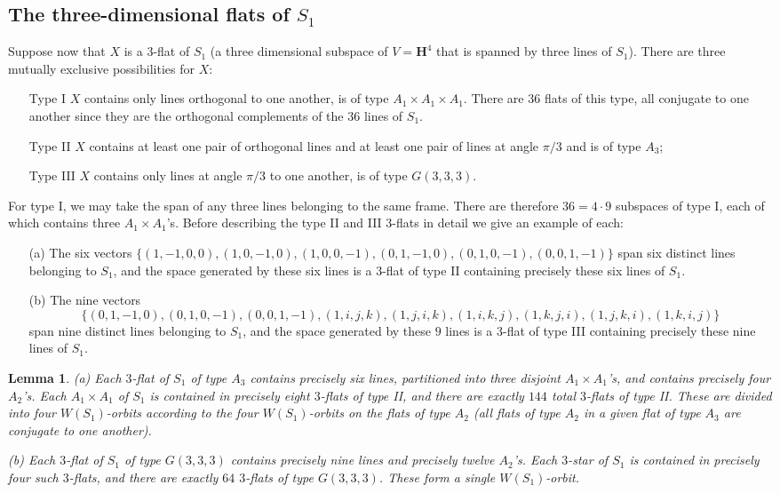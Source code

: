 \documentclass[11pt, reqno]{amsart}
\numberwithin{equation}{section}
\theoremstyle{definition}
\theoremstyle{plain}
\newtheorem{lemma}[theorem]{Lemma}
\newcommand{\HH}{\mathbf{H}}
\begin{document}
\subsection{The three-dimensional flats of $S_1$} Suppose now that $X$ is a $3$-flat of $S_1$ (a three dimensional subspace of $V=\HH^4$ that is spanned by three lines of $S_1$). There are three mutually exclusive possibilities for $X$: 

\begin{itemize}
\item[Type I] $X$ contains only lines orthogonal to one another, is of type $A_1 \times A_1 \times A_1$. There are $36$ flats of this type, all conjugate to one another since they are the orthogonal complements of the $36$ lines of $S_1$.
\item[Type II] $X$ contains at least one pair of orthogonal lines and at least one pair of lines at angle $\pi/3$ and is of type $A_3$; 
\item[Type III] $X$ contains only lines at angle $\pi/3$ to one another, is of type $G(3,3,3)$. 
\end{itemize} For type I, we may take the span of any three lines belonging to the same frame. There are therefore $36=4 \cdot 9$ subspaces of type I, each of which contains three $A_1 \times A_1$'s. Before describing the type II and III $3$-flats in detail we give an example of each:
\begin{itemize}
\item[(a)] The six vectors $\{(1,-1,0,0),(1,0,-1,0),(1,0,0,-1),(0,1,-1,0),(0,1,0,-1),(0,0,1,-1)\}$ span six distinct lines belonging to $S_1$, and the space generated by these six lines is a $3$-flat of type II containing precisely these six lines of $S_1$. 
\item[(b)] The nine vectors $$\{(0,1,-1,0),(0,1,0,-1),(0,0,1,-1),(1,i,j,k),(1,j,i,k),(1,i,k,j),(1,k,j,i),(1,j,k,i),(1,k,i,j)\}$$ span nine distinct lines belonging to $S_1$, and the space generated by these $9$ lines is a $3$-flat of type III containing precisely these nine lines of $S_1$.
\end{itemize}
\begin{lemma}
\item[(a)] Each $3$-flat of $S_1$ of type $A_3$ contains precisely six lines, partitioned into three disjoint $A_1 \times A_1$'s, and contains precisely four $A_2$'s. Each $A_1 \times A_1$ of $S_1$ is contained in precisely eight $3$-flats of type II, and there are exactly $144$ total $3$-flats of type II. These are divided into four $W(S_1)$-orbits according to the four $W(S_1)$-orbits on the flats of type $A_2$ (all flats of type $A_2$ in a given flat of type $A_3$ are conjugate to one another). 
\item[(b)] Each $3$-flat of $S_1$ of type $G(3,3,3)$ contains precisely nine lines and precisely twelve $A_2$'s. Each $3$-star of $S_1$ is contained in precisely four such $3$-flats, and there are exactly $64$ $3$-flats of type $G(3,3,3)$. These form a single $W(S_1)$-orbit.
\end{lemma}
\end{document}
